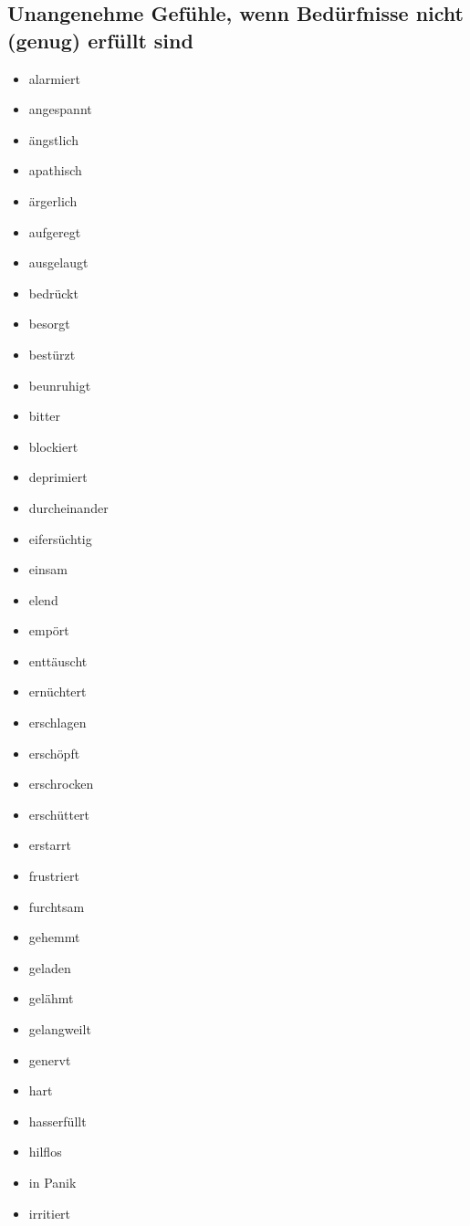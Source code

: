 \subsection{Unangenehme Gefühle, wenn Bedürfnisse nicht (genug) erfüllt sind}
\begin{multicols}{2}
  \begin{itemize}
    \item alarmiert
    \item angespannt
    \item ängstlich
    \item apathisch
    \item ärgerlich
    \item aufgeregt
    \item ausgelaugt
    \item bedrückt
    \item besorgt
    \item bestürzt
    \item beunruhigt
    \item bitter
    \item blockiert
    \item deprimiert
    \item durcheinander
    \item eifersüchtig
    \item einsam
    \item elend
    \item empört
    \item enttäuscht
    \item ernüchtert
    \item erschlagen
    \item erschöpft
    \item erschrocken
    \item erschüttert
    \item erstarrt
    \item frustriert
    \item furchtsam
    \item gehemmt
    \item geladen
    \item gelähmt
    \item gelangweilt
    \item genervt
    \item hart
    \item hasserfüllt
    \item hilflos
    \item in Panik
    \item irritiert

\end{itemize}
\end{multicols}
